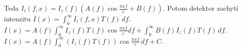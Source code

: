 Teda $I_i(f,x)= I_z(f) (A(f) \cos \frac{\pi x f}{c} + B(f))$. Potom
detektor zachytí intenzitu 
$I(x)=\int_0^\infty I_i(f,x) T(f)\,df$.
$I(x)=A(f) \int_0^\infty I_z(f) T(f) \cos \frac{\pi x f}{c}
df +\int_0^\infty B(f) I_z(f) T(f)\,df$.
$I(x)=A(f) \int_0^\infty (I_z(f) T(f)) \cos \frac{\pi x f}{c}\,df +
C$.



